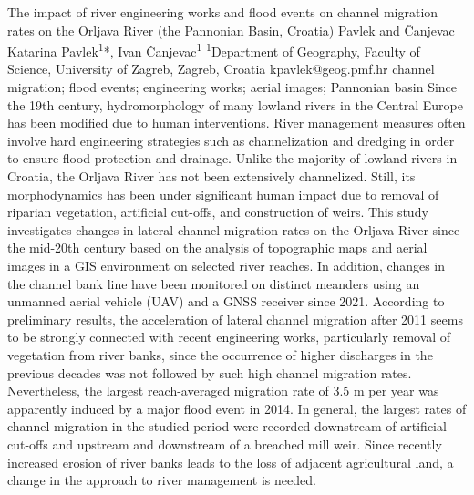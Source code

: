 \abstract
{The impact of river engineering works and flood events on channel migration rates on the Orljava River (the Pannonian Basin, Croatia)} 
{Pavlek and Čanjevac} 
{Katarina Pavlek\textsuperscript{1}*, Ivan Čanjevac\textsuperscript{1}} 
{\TLtag} 
{
\textsuperscript{1}Department of Geography, Faculty of Science, University of Zagreb, Zagreb, Croatia
}
{kpavlek@geog.pmf.hr}  %
{channel migration; flood events; engineering works; aerial images; Pannonian basin}
{Since the 19th century, hydromorphology of many lowland rivers in the Central Europe has been modified due to human interventions. River management measures often involve hard engineering strategies such as channelization and dredging in order to ensure flood protection and drainage. Unlike the majority of lowland rivers in Croatia, the Orljava River has not been extensively channelized. Still, its morphodynamics has been under significant human impact due to removal of riparian vegetation, artificial cut-offs, and construction of weirs. This study investigates changes in lateral channel migration rates on the Orljava River since the mid-20th century based on the analysis of topographic maps and aerial images in a GIS environment on selected river reaches. In addition, changes in the channel bank line have been monitored on distinct meanders using an unmanned aerial vehicle (UAV) and a GNSS receiver since 2021. According to preliminary results, the acceleration of lateral channel migration after 2011 seems to be strongly connected with recent engineering works, particularly removal of vegetation from river banks, since the occurrence of higher discharges in the previous decades was not followed by such high channel migration rates. Nevertheless, the largest reach-averaged migration rate of 3.5 m per year was apparently induced by a major flood event in 2014. In general, the largest rates of channel migration in the studied period were recorded downstream of artificial cut-offs and upstream and downstream of a breached mill weir. Since recently increased erosion of river banks leads to the loss of adjacent agricultural land, a change in the approach to river management is needed.
}
{
}

